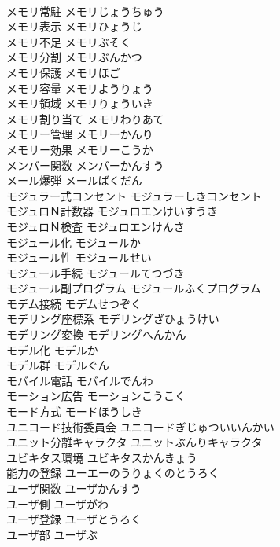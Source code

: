 \documentclass[8pt]{extreport}
\begin{document}
\begin{CJK}{UTF8}{min}
\\	メモリ常駐	メモリじょうちゅう	
\\	メモリ表示	メモリひょうじ	
\\	メモリ不足	メモリぶそく	
\\	メモリ分割	メモリぶんかつ	
\\	メモリ保護	メモリほご	
\\	メモリ容量	メモリようりょう	
\\	メモリ領域	メモリりょういき	
\\	メモリ割り当て	メモリわりあて	
\\	メモリー管理	メモリーかんり	
\\	メモリー効果	メモリーこうか	
\\	メンバー関数	メンバーかんすう	
\\	メール爆弾	メールばくだん	
\\	モジュラー式コンセント	モジュラーしきコンセント	
\\	モジュロＮ計数器	モジュロエンけいすうき	
\\	モジュロＮ検査	モジュロエンけんさ	
\\	モジュール化	モジュールか	
\\	モジュール性	モジュールせい	
\\	モジュール手続	モジュールてつづき	
\\	モジュール副プログラム	モジュールふくプログラム	
\\	モデム接続	モデムせつぞく	
\\	モデリング座標系	モデリングざひょうけい	
\\	モデリング変換	モデリングへんかん	
\\	モデル化	モデルか	
\\	モデル群	モデルぐん	
\\	モバイル電話	モバイルでんわ	
\\	モーション広告	モーションこうこく	
\\	モード方式	モードほうしき	
\\	ユニコード技術委員会	ユニコードぎじゅついいんかい	
\\	ユニット分離キャラクタ	ユニットぶんりキャラクタ	
\\	ユビキタス環境	ユビキタスかんきょう	
\\	能力の登録	ユーエーのうりょくのとうろく	
\\	ユーザ関数	ユーザかんすう	
\\	ユーザ側	ユーザがわ	
\\	ユーザ登録	ユーザとうろく	
\\	ユーザ部	ユーザぶ	

\end{CJK}
\end{document}
